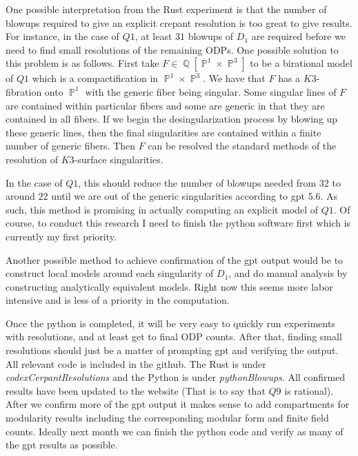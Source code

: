 \documentclass{article}
\DeclareMathOperator{\QQ}{\mathbb{Q}}
\DeclareMathOperator{\PP}{\mathbb{P}}
\begin{document}
One possible interpretation from the Rust experiment is that the number of blowups required to give an explicit crepant resolution is too great to give results. For instance, in the case of $Q1$, at least $31$ blowups of $D_1$ are required before we need to find small resolutions of the remaining ODPs. One possible solution to this problem is as follows. First take $F \in \QQ[\PP^1 \times \PP^3]$ to be a birational model of $Q1$ which is a compactification in $\PP^1 \times \PP^3$. We have that $F$ has a $K3$-fibration onto $\PP^1$ with the generic fiber being singular. Some singular lines of $F$ are contained within particular fibers and some are generic in that they are contained in all fibers. If we begin the desingularization process by blowing up these generic lines, then the final singularities are contained within a finite number of generic fibers. Then $F$ can be resolved the standard methods of the resolution of $K3$-surface singularities.

In the case of $Q1$, this should reduce the number of blowups needed from $32$ to around $22$ until we are out of the generic singularities according to gpt 5.6. As such, this method is promising in actually computing an explicit model of $Q1$. Of course, to conduct this research I need to finish the python software first which is currently my first priority.

Another possible method to achieve confirmation of the gpt output would be to construct local models around each singularity of $D_1$, and do manual analysis by constructing analytically equivalent models. Right now this seems more labor intensive and is less of a priority in the computation.

Once the python is completed, it will be very easy to quickly run experiments with resolutions, and at least get to final ODP counts. After that, finding small resolutions should just be a matter of prompting gpt and verifying the output. All relevant code is included in the github. The Rust is under \textit{codexCerpantResolutions} and the Python is under \textit{pythonBlowups}. All confirmed results have been updated to the website (That is to say that $Q9$ is rational). After we confirm more of the gpt output it makes sense to add compartments for modularity results including the corresponding modular form and finite field counts. Ideally next month we can finish the python code and verify as many of the gpt results as possible.
\end{document}

